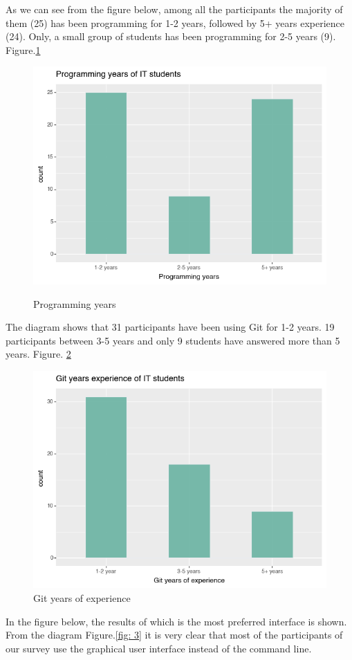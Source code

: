 \documentclass[]{report}
\begin{document}
	As we can see from the figure below, among all the participants the majority of them (25) has been programming for 1-2 years, followed by 5+ years experience (24). Only, a small group of students has been programming for 2-5 years (9). Figure.\ref{fig: 1}
	
	\begin{figure}[H]
		\centering
		\includegraphics[width=0.75\linewidth]{ProgrammingYears}\\
		\caption{Programming years}
		\label{fig: 1}
	\end{figure}
	
		The diagram shows that 31 participants have been using Git for 1-2 years. 19 participants between 3-5 years and only 9 students have answered more than 5 years. Figure. \ref{fig: 2}
	\begin{figure}[H]
		\centering
		\includegraphics[width=0.75\linewidth]{GitYearsExperience}
		\caption{Git years of experience}
		\label{fig: 2}
	\end{figure}
	
	In the figure below, the results of which is the most preferred interface is shown. From the diagram Figure.\ref{fig: 3} it is very clear that most of the participants of our survey use the graphical user interface instead of the command line.
	
\end{document}
